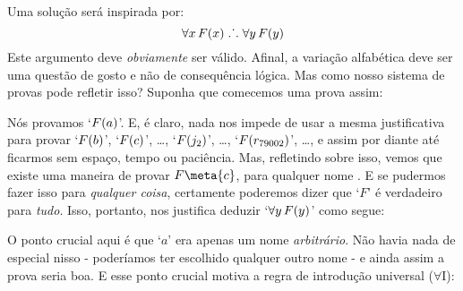 Uma solu\c c\~ao ser\'a inspirada por:
$$\forall x\,\mathord{F}(x) \mathrel{\ldotp\dot{}\,\ldotp} \forall y\,\mathord{F}(y)$$
Este argumento deve \emph{obviamente} ser v\'alido. Afinal, a varia\c c\~ao alfab\'etica deve ser uma quest\~ao de gosto e  n\~ao de consequ\^encia l\'ogica. Mas como nosso sistema de provas  pode refletir isso? Suponha que comecemos uma prova assim:
\begin{fitchproof}
	 
\end{fitchproof}
  N\'os provamos `$\mathord{F}(a)$'. E, \'e claro, nada nos impede de usar a mesma justificativa para provar `$\mathord{F}(b)$', `$\mathord{F}(c)$', \ldots, `$\mathord{F}(j_2)$', \ldots, `$\mathord{F}(r_{79002})$', \dots, e assim por diante at\'e ficarmos sem espa\c co, tempo ou paci\^encia. Mas, refletindo sobre isso, vemos que existe uma maneira de provar $F\meta{c}$, para qualquer nome . E se pudermos fazer isso para   \emph{qualquer coisa}, certamente poderemos dizer que  `$F$' \'e verdadeiro para \emph{tudo}. Isso, portanto, nos justifica deduzir `$\forall y\,\mathord{F}(y)$' como segue:
\begin{fitchproof}
	 
	 
\end{fitchproof}
O ponto crucial aqui \'e que `$a$' era apenas um nome   \emph{arbitr\'ario}. N\~ao havia nada de especial nisso - poder\'iamos ter escolhido qualquer outro nome - e ainda assim a prova seria boa. E esse ponto crucial motiva a regra de introdu\c c\~ao  universal ($\forall$I):

